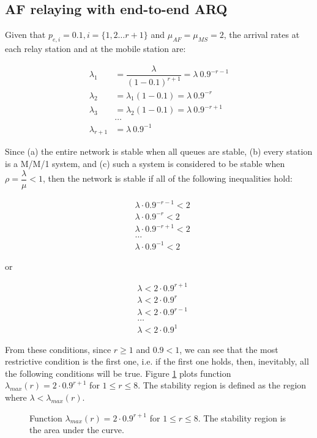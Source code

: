 \subsection{AF relaying with end-to-end ARQ}

Given that $p_{e,i} = 0.1, i = \{1,2 \dots r+1\}$ and $\mu_{AF} = \mu_{MS} = 2$,
the arrival rates at each relay station and at the mobile station are:

\begin{align*}
  \lambda_1 &= \dfrac{\lambda}{(1-0.1)^{r+1}} = \lambda\ 0.9^{-r-1} \\
  \lambda_2 &= \lambda_1 (1-0.1) = \lambda\ 0.9^{-r} \\
  \lambda_3 &= \lambda_2 (1-0.1) = \lambda\ 0.9^{-r + 1} \\
  & \dots \\
  \lambda_{r+1} &= \lambda\ 0.9^{-1}
\end{align*}

Since (a) the entire network is stable when all queues are stable, (b) every
station is a M/M/1 system, and (c) such a system is considered to be stable
when $\rho = \dfrac{\lambda}{\mu} < 1$, then the network is stable if all of the
following inequalities hold:

\begin{align*}
  &\lambda\cdot  0.9^{-r-1} < 2 \\
  &\lambda\cdot  0.9^{-r} < 2 \\
  &\lambda\cdot  0.9^{-r + 1} < 2 \\
  & \dots \\
  &\lambda\cdot  0.9^{-1} < 2
\end{align*}

or

\begin{align*}
  &\lambda < 2\cdot  0.9^{r+1}\\
  &\lambda < 2\cdot   0.9^{r}\\
  &\lambda < 2\cdot   0.9^{r-1}\\
  & \dots \\
  &\lambda < 2\cdot  0.9^{1}
\end{align*}

From these conditions, since $r \geq 1$ and $0.9 < 1$, we can see that the most
restrictive condition is the first one, i.e. if the first one holds, then,
inevitably, all the following conditions will be true. Figure
\ref{fig:04_stability_region_af_e2e} plots function
$\lambda_{max}(r) = 2 \cdot 0.9^{r+1}$ for $1 \leq r \leq 8$. The stability region
is defined as the region where $\lambda < \lambda_{max}(r)$.

\begin{figure}[H]\centering
  
  \caption{Function $\lambda_{max}(r) = 2\cdot  0.9^{r+1}$ for $1 \leq r \leq 8$.
    The stability region is the area under the curve.}
  \label{fig:04_stability_region_af_e2e}
\end{figure}

